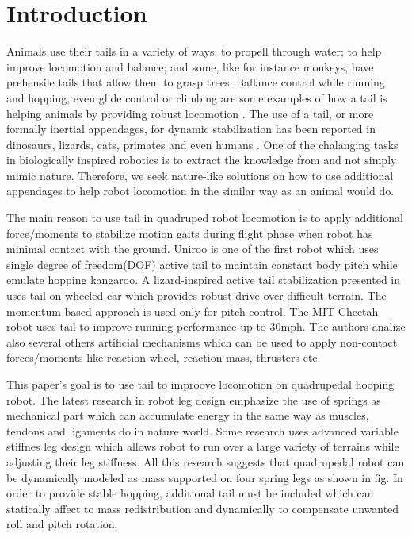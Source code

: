 \section{Introduction}\label{sec:introduction}

Animals use their tails in a variety of ways: to propell through water; to help improve locomotion and balance; and some, like for instance monkeys, have prehensile tails that allow them to grasp trees. Ballance control while running and hopping, even glide control or climbing are some examples of how a tail is helping animals by providing robust locomotion \cite{Thomas:Nature2012}. The use of a tail, or more formally inertial appendages, for dynamic stabilization has been reported in dinosaurs, lizards, cats, primates and even humans \cite{ostrom1969osteology,PijnappelsSringer,Walker199841,JusufiIOP2010}. One of the chalanging tasks in biologically inspired robotics is to extract the knowledge from and not simply mimic nature. Therefore, we seek nature-like solutions on how to use additional appendages to help robot locomotion in the similar way as an animal would do.  

The main reason to use tail in quadruped robot locomotion is to apply additional force/moments to stabilize motion gaits during flight phase when robot has minimal contact with the ground. Uniroo \cite{zeglin1991uniroo} is one of the first robot which uses single degree of freedom(DOF) active tail to maintain constant body pitch while emulate hopping kangaroo. A lizard-inspired active tail stabilization presented in \cite{conf/iros/Chang-SiuLTF11} uses tail on wheeled car which provides robust drive over difficult terrain. The momentum based approach is used only for pitch control. The MIT Cheetah robot \cite{DBLP:conf/iros/BriggsLHK12} uses tail to improve running performance up to 30mph. The authors analize also several others artificial mechanisms which can be used to apply non-contact forces/moments like reaction wheel, reaction mass, thrusters etc. 

This paper's goal is to use tail to improove locomotion on quadrupedal hooping robot. The latest research in robot leg design emphasize the use of springs as mechanical part which can accumulate energy in the same way as muscles, tendons and ligaments do in nature world\cite{Zeglin_1999_3268}\cite{Hutter}. Some research uses advanced variable stiffnes leg design \cite{Hurst_2004_4785}\cite{Galloway}\cite{Jun:2009:DSV:1703775.1704089} which allows robot to run over a large variety of terrains while adjusting their leg stiffness. All this research suggests that quadrupedal robot can be dynamically modeled as mass supported on four spring legs as shown in fig. In order to provide stable hopping, additional tail must be included which can statically affect to mass redistribution and dynamically to compensate unwanted roll and pitch rotation. 


